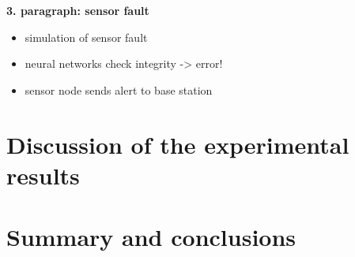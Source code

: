 \documentclass[12pt]{scrartcl}
\begin{document}
\textbf{3. paragraph: sensor fault}

\begin{itemize}
\item simulation of sensor fault
\item neural networks check integrity -> error!
\item sensor node sends alert to base station
\end{itemize}


\section*{Discussion of the experimental results}


\section*{Summary and conclusions}




\end{document}
